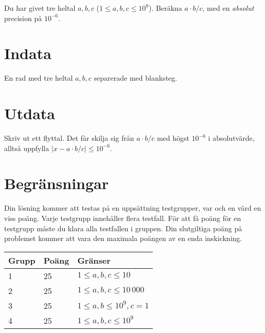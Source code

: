 
Du har givet tre heltal $a, b, c$ ($1 \le a, b, c \le 10^9$). Beräkna $a \cdot b / c$, med en \emph{absolut} precision på $10^{-6}$.

\section*{Indata}
En rad med tre heltal $a, b, c$ separerade med blanksteg.

\section*{Utdata}
Skriv ut ett flyttal. Det får skilja sig från $a \cdot b / c$ med högst $10^{-6}$ i absolutvärde, alltså uppfylla $|x - a \cdot b / c| \le 10^{-6}$.

\section*{Begränsningar}
Din lösning kommer att testas på en uppsättning testgrupper, var och en värd en viss poäng.
Varje testgrupp innehåller flera testfall.
För att få poäng för en testgrupp måste du klara alla testfallen i gruppen.
Din slutgiltiga poäng på problemet kommer att vara den maximala poängen av en enda inskickning.

\noindent
\begin{tabular}{| l | l | l |}
\hline
Grupp & Poäng & Gränser \\ \hline
1     & 25    & $1 \le a, b, c \le 10$ \\ \hline
2     & 25    & $1 \le a, b, c \le 10\,000$ \\ \hline
3     & 25    & $1 \le a, b \le 10^9, c = 1$ \\ \hline
4     & 25    & $1 \le a, b, c \le 10^9$ \\ \hline
\end{tabular}
